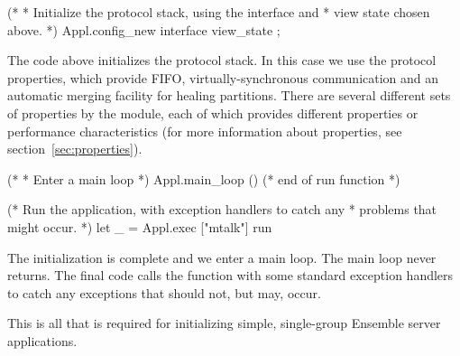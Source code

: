 \begin{codebox}    
  (*
   * Initialize the protocol stack, using the interface and
   * view state chosen above.  
   *)
  Appl.config_new interface view_state ;
\end{codebox}    
The code above initializes the protocol stack.  In this case we use
the  protocol properties, which provide FIFO,
virtually-synchronous communication and an automatic merging facility
for healing partitions.  There are several different sets of
properties by the  module, each of which
provides different properties or performance characteristics (for
more information about properties, see section~\ref{sec:properties}).

\begin{codebox}    
  (*
   * Enter a main loop
   *)
  Appl.main_loop ()
  (* end of run function *)


(* Run the application, with exception handlers to catch any
 * problems that might occur.
 *)
let _ = Appl.exec ["mtalk"] run
\end{codebox}    
The initialization is complete and we enter a main loop.  The main
loop never returns.  The final code calls the  function
with some standard exception handlers to catch any exceptions that
should not, but may, occur.

This is all that is required for initializing simple, single-group Ensemble
server applications.  
